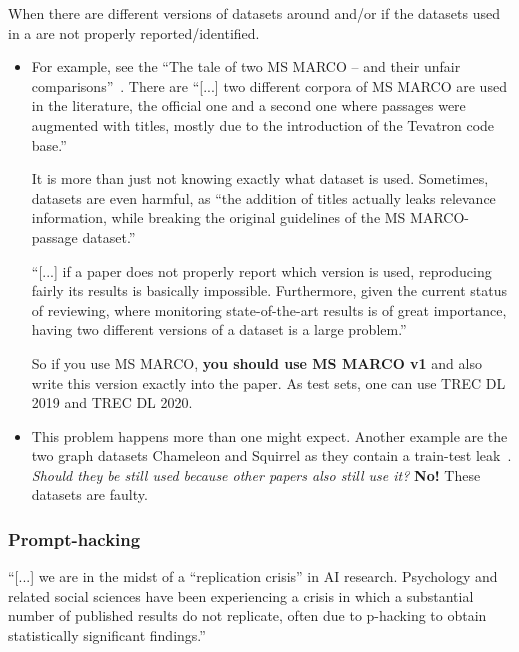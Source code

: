\documentclass[manuscript, nonacm]{acmart}
\begin{document}
When there are different versions of datasets around and/or if the datasets used in a are not properly reported/identified.

 \begin{itemize}
\item For example, see the ``The tale of two MS MARCO -- and their unfair comparisons''~\cite{DBLP:conf/sigir/LassanceC23}. There are ``[...] two different corpora of MS MARCO are used in the literature, the official one and a second one where passages were augmented with titles, mostly due to the introduction of the Tevatron code base.''

It is more than just not knowing exactly what dataset is used. 
Sometimes, datasets are even harmful, as ``the addition of titles actually leaks relevance information, while breaking the original guidelines of the MS MARCO-passage dataset.''~\cite{DBLP:conf/sigir/LassanceC23}

``[...] if a paper does not properly report which version is used, reproducing fairly its results is basically impossible. Furthermore, given the current status of reviewing, where monitoring state-of-the-art results is of great importance, having two different versions of a dataset is a large problem.''~\cite{DBLP:conf/sigir/LassanceC23}

So if you use MS MARCO, \textbf{you should use MS MARCO v1} and also write this version exactly into the paper. 
As test sets, one can use TREC DL 2019 and TREC DL 2020.

\item This problem happens more than one might expect.
Another example are the two graph datasets Chameleon and Squirrel as they contain a train-test leak~\cite{DBLP:conf/iclr/PlatonovKDBP23}.
\textit{Should they be still used because other papers also still use it?} 
\textbf{No!}
These datasets are faulty.

\end{itemize}

\subsubsection{Prompt-hacking}

``[...] we are in the midst of a “replication crisis” in AI research. Psychology and related social sciences have been experiencing a crisis in which a substantial number of published results do not replicate, often due to p-hacking to obtain statistically significant findings.''~\cite{DBLP:journals/cacm/PromptHacking}
\end{document}
